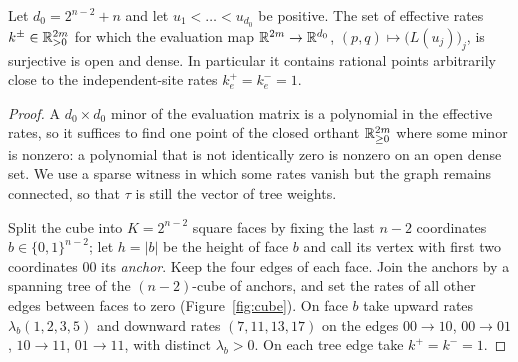 \begin{lemma}\label{lem:rank}
Let \(d_0=2^{n-2}+n\) and let \(u_1<\dots<u_{d_0}\) be positive. The set of effective rates
\(k^\pm\in\mathbb R^{2m}_{>0}\) for which the evaluation map
\(\mathbb R^{2m}\to\mathbb R^{d_0}\), \((p,q)\mapsto\bigl(L(u_j)\bigr)_j\), is surjective is open and
dense. In particular it contains rational points arbitrarily close to the independent-site
rates \(k_e^+=k_e^-=1\).
\end{lemma}
\begin{proof}
A \(d_0\times d_0\) minor of the evaluation matrix is a polynomial in the effective rates, so
it suffices to find one point of the closed orthant \(\mathbb R^{2m}_{\ge0}\) where some minor is
nonzero: a polynomial that is not identically zero is nonzero on an open dense set. We use a
sparse witness in which some rates vanish but the graph remains connected, so that \(\tau\) is
still the vector of tree weights.

Split the cube into \(K=2^{n-2}\) square faces by fixing the last \(n-2\) coordinates
\(b\in\{0,1\}^{n-2}\); let \(h=|b|\) be the height of face \(b\) and call its vertex with first
two coordinates \(00\) its \emph{anchor}. Keep the four edges of each face. Join the anchors by
a spanning tree of the \((n-2)\)-cube of anchors, and set the rates of all other edges between
faces to zero (Figure~\ref{fig:cube}). On face \(b\) take upward rates \(\lambda_b(1,2,3,5)\)
and downward rates \((7,11,13,17)\) on the edges \(00\to10\), \(00\to01\), \(10\to11\),
\(01\to11\), with distinct \(\lambda_b>0\). On each tree edge take \(k^+=k^-=1\).


\end{proof}
